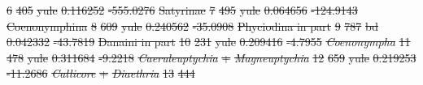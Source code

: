 \documentclass[10pt,letterpaper]{article} %
\providecommand{\DIFdel}[1]{{\protect\color{red}\sout{#1}}}                      %
\begin{document}
\DIFdel{6               }%
\DIFdel{405        }%
\DIFdel{yule  }%
\DIFdel{0.116252   }%
\DIFdel{-555.0276  }%
\DIFdel{Satyrinae                                                   }%
\DIFdel{7               }%
\DIFdel{495        }%
\DIFdel{yule  }%
\DIFdel{0.064656   }%
\DIFdel{-124.9143  }%
\DIFdel{Coenonymphina                                              }%
\DIFdel{8               }%
\DIFdel{609        }%
\DIFdel{yule  }%
\DIFdel{0.240562   }%
\DIFdel{-35.0908   }%
\DIFdel{Phyciodina in part                                         }%
\DIFdel{9               }%
\DIFdel{787        }%
\DIFdel{bd    }%
\DIFdel{0.042332   }%
\DIFdel{-43.7819   }%
\DIFdel{Danaini in part                                            }%
\DIFdel{10              }%
\DIFdel{231        }%
\DIFdel{yule  }%
\DIFdel{0.209416   }%
\DIFdel{-4.7955    }%
\emph{\DIFdel{Coenonympha}}                                         %
\DIFdel{11              }%
\DIFdel{478        }%
\DIFdel{yule  }%
\DIFdel{0.311684   }%
\DIFdel{-9.2218    }%
\emph{\DIFdel{Caeruleuptychia}} %
\DIFdel{+ }\emph{\DIFdel{Magneuptychia}}              %
\DIFdel{12              }%
\DIFdel{659        }%
\DIFdel{yule  }%
\DIFdel{0.219253   }%
\DIFdel{-11.2686   }%
\emph{\DIFdel{Callicore}} %
\DIFdel{+ }\emph{\DIFdel{Diaethria}}                        %
\DIFdel{13              }%
\DIFdel{444        }%
\end{document}
